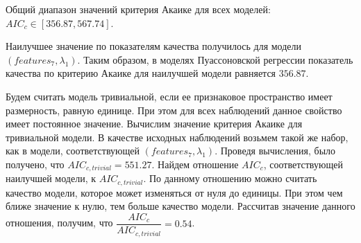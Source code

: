 

Общий диапазон значений критерия Акаике для всех моделей: $AIC_c \in [356.87, 567.74]$.


Наилучшее значение по показателям качества получилось для модели $(features_7, \lambda_1)$. Таким образом, в моделях Пуассоновской регрессии показатель качества по критерию Акаике для наилучшей модели равняется $356.87$.



Будем считать модель тривиальной, если ее признаковое пространство имеет размерность, равную единице. При этом для всех наблюдений данное свойство имеет постоянное значение. Вычислим значение критерия Акаике для тривиальной модели. В качестве исходных наблюдений возьмем такой же набор, как в модели, соответствующей $(features_7, \lambda_1)$. Проведя вычисления, было получено, что $AIC_{c, trivial} = 551.27$. Найдем отношение $AIC_c$, соответствующей наилучшей модели, к $AIC_{c, trivial}$. По данному отношению можно считать качество модели, которое может изменяться от нуля до единицы. При этом чем ближе значение к нулю, тем больше качество модели. Рассчитав значение данного отношения, получим, что $\dfrac{AIC_c}{AIC_{c, trivial}} = 0.54$.





